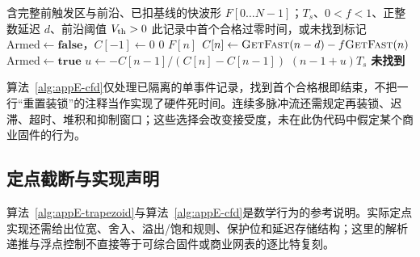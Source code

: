 \begin{algorithm}[!htbp]
\caption{单个已隔离波形记录的CFD线性过零参考算法}\label{alg:appE-cfd}
\begin{algorithmic}[1]
\Require 含完整前触发区与前沿、已扣基线的快波形 $F[0\dots N-1]$；$T_s$、$0<f<1$、正整数延迟 $d$、前沿阈值 $V_{\rm th}>0$
\Ensure 此记录中首个合格过零时间，或未找到标记
\State $\mathrm{Armed}\gets\mathbf{false}$，$C[-1]\gets0$
     \State \Return $0$ \Else \State \Return $F[n]$ \EndIf
\EndFunction
{}
    \State $C[n]\gets\Call{GetFast}{n-d}-f\Call{GetFast}{n}$
        \State $\mathrm{Armed}\gets\mathbf{true}$
    \EndIf
        \State $u\gets-C[n-1]/(C[n]-C[n-1])$
        \State \Return $(n-1+u)T_s$
    \EndIf
\EndFor
\State \Return \textbf{未找到}
\end{algorithmic}
\end{algorithm}

算法~\ref{alg:appE-cfd}仅处理已隔离的单事件记录，找到首个合格根即结束，不把一行“重置装锁”的注释当作实现了硬件死时间。连续多脉冲流还需规定再装锁、迟滞、超时、堆积和抑制窗口；这些选择会改变接受度，未在此伪代码中假定某个商业固件的行为。

\subsection{定点截断与实现声明}

算法~\ref{alg:appE-trapezoid}与算法~\ref{alg:appE-cfd}是数学行为的参考说明。实际定点实现还需给出位宽、舍入、溢出/饱和规则、保护位和延迟存储结构；这里的解析递推与浮点控制不直接等于可综合固件或商业网表的逐比特复刻。
